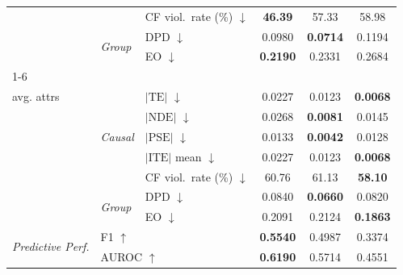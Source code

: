 \begin{table}[t]
\begin{tabular}{@{}lll ccc@{}}
  & & CF viol.\ rate (\%) $\downarrow$ & \textbf{46.39} & 57.33 & 58.98 \\
  & \multirow{2}{*}{\scriptsize\textit{Group}} & DPD $\downarrow$ & 0.0980 & \textbf{0.0714} & 0.1194 \\
  & & EO $\downarrow$ & \textbf{0.2190} & 0.2331 & 0.2684 \\
\cmidrule(lr){1-6}
  \multirow{7}{*}{\makecell[l]{\textit{Overall}\\[-2pt]\scriptsize avg. attrs}} & \multirow{5}{*}{\scriptsize\textit{Causal}} & $|\mathrm{TE}|$ $\downarrow$ & 0.0227 & 0.0123 & \textbf{0.0068} \\
  & & $|\mathrm{NDE}|$ $\downarrow$ & 0.0268 & \textbf{0.0081} & 0.0145 \\
  & & $|\mathrm{PSE}|$ $\downarrow$ & 0.0133 & \textbf{0.0042} & 0.0128 \\
  & & $|\mathrm{ITE}|$ mean $\downarrow$ & 0.0227 & 0.0123 & \textbf{0.0068} \\
  & & CF viol.\ rate (\%) $\downarrow$ & 60.76 & 61.13 & \textbf{58.10} \\
  & \multirow{2}{*}{\scriptsize\textit{Group}} & DPD $\downarrow$ & 0.0840 & \textbf{0.0660} & 0.0820 \\
  & & EO $\downarrow$ & 0.2091 & 0.2124 & \textbf{0.1863} \\
\midrule
\multirow{2}{*}{\textit{Predictive Perf.}} & \multicolumn{2}{l}{F1 $\uparrow$} & \textbf{0.5540} & 0.4987 & 0.3374 \\
  & \multicolumn{2}{l}{AUROC $\uparrow$} & \textbf{0.6190} & 0.5714 & 0.4551 \\
\bottomrule
\end{tabular}
\end{table}